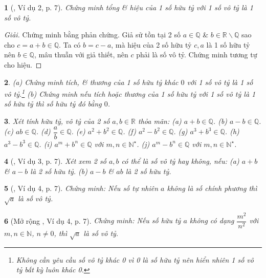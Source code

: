 \documentclass{article}
\newtheorem{baitoan}{}%
\begin{document}
\begin{baitoan}[\cite{Binh_Toan_9_tap_1}, Ví dụ 2, p. 7]
	Chứng minh tổng \& hiệu của 1 số hữu tỷ với 1 số vô tỷ là 1 số vô tỷ.
\end{baitoan}

\begin{proof}[Giải]
	Chứng minh bằng phản chứng. Giả sử tồn tại 2 số $a\in\mathbb{Q}$ \& $b\in\mathbb{R}\backslash\mathbb{Q}$ sao cho $c = a + b\in\mathbb{Q}$. Ta có $b = c - a$, mà hiệu của 2 số hữu tỷ $c,a$ là 1 số hữu tỷ nên $b\in\mathbb{Q}$, mâu thuẫn với giả thiết, nên $c$ phải là số vô tỷ. Chứng minh tương tự cho hiệu.
\end{proof}

\begin{baitoan}
	(a) Chứng minh tích, \& thương của 1 số hữu tỷ khác $0$ với 1 số vô tỷ là 1 số vô tỷ.\footnote{Không cần yêu cầu số vô tỷ khác 0 vì 0 là số hữu tỷ nên hiển nhiên 1 số vô tỷ bất kỳ luôn khác 0.} (b) Chứng minh nếu tích hoặc thương của 1 số hữu tỷ với 1 số vô tỷ là 1 số hữu tỷ thì số hữu tỷ đó bằng $0$. 
\end{baitoan}

\begin{baitoan}
	Xét tính hữu tỷ, vô tỷ của 2 số $a,b\in\mathbb{R}$ thỏa mãn: (a) $a + b\in\mathbb{Q}$. (b) $a - b\in\mathbb{Q}$. (c) $ab\in\mathbb{Q}$. (d) $\dfrac{a}{b}\in\mathbb{Q}$. (e) $a^2 + b^2\in\mathbb{Q}$. (f) $a^2 - b^2\in\mathbb{Q}$. (g) $a^3 + b^3\in\mathbb{Q}$. (h) $a^3 - b^3\in\mathbb{Q}$. (i) $a^m + b^n\in\mathbb{Q}$ với $m,n\in\mathbb{N}^\star$. (j) $a^m - b^n\in\mathbb{Q}$ với $m,n\in\mathbb{N}^\star$.
\end{baitoan}

\begin{baitoan}[\cite{Binh_Toan_9_tap_1}, Ví dụ 3, p. 7]
	Xét xem 2 số $a,b$ có thể là số vô tỷ hay không, nếu: (a) $a + b$ \& $a - b$ là 2 số hữu tỷ. (b) $a - b$ \& $ab$ là 2 số hữu tỷ.
\end{baitoan}

\begin{baitoan}[\cite{Binh_Toan_9_tap_1}, Ví dụ 4, p. 7]
	Chứng minh: Nếu số tự nhiên $a$ không là số chính phương thì $\sqrt{a}$ là số vô tỷ.
\end{baitoan}

\begin{baitoan}[Mở rộng \cite{Binh_Toan_9_tap_1}, Ví dụ 4, p. 7]
	Chứng minh: Nếu số hữu tỷ $a$ không có dạng $\dfrac{m^2}{n^2}$ với $m,n\in\mathbb{N}$, $n\ne0$, thì $\sqrt{a}$ là số vô tỷ.
\end{baitoan}
\end{document}
